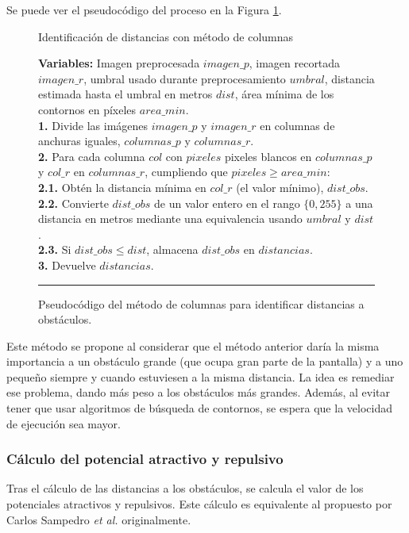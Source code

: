 \begin{itemize}
Se puede ver el pseudocódigo del proceso en la Figura \ref{alg:column}.

\begin{figure}[h]
\begin{algorithm}[H]
\caption{Identificación de distancias con método de columnas}
\textbf{Variables:} Imagen preprocesada $imagen\_p$, imagen recortada $imagen\_r$, umbral usado durante preprocesamiento $umbral$, distancia estimada hasta el umbral en metros $dist$, área mínima de los contornos en píxeles $area\_min$.\\
\textbf{1.} Divide las imágenes $imagen\_p$ y $imagen\_r$ en columnas de anchuras iguales, $columnas\_p$ y $columnas\_r$.\\
\textbf{2.} Para cada columna $col$ con $pixeles$ pixeles blancos en $columnas\_p$ y $col\_r$ en $columnas\_r$, cumpliendo que $pixeles \geq area\_min$:\\
\Indp\textbf{2.1.} Obtén la distancia mínima en $col\_r$ (el valor mínimo), $dist\_obs$.\\
\textbf{2.2.} Convierte $dist\_obs$ de un valor entero en el rango $\{0, 255\}$ a una distancia en metros mediante una equivalencia usando $umbral$ y $dist$.\\
\textbf{2.3.} Si $dist\_obs \leq dist$, almacena $dist\_obs$ en $distancias$.\\
\Indm \textbf{3.} Devuelve $distancias$.
\end{algorithm}
\hrule
\caption{Pseudocódigo del método de columnas para identificar distancias a obstáculos.}
\label{alg:column}
\end{figure}

Este método se propone al considerar que el método anterior daría la misma importancia a un obstáculo grande (que ocupa gran parte de la pantalla) y a uno pequeño siempre y cuando estuviesen a la misma distancia. La idea es remediar ese problema, dando más peso a los obstáculos más grandes. Además, al evitar tener que usar algoritmos de búsqueda de contornos, se espera que la velocidad de ejecución sea mayor.

\end{itemize}

\subsubsection{Cálculo del potencial atractivo y repulsivo}

Tras el cálculo de las distancias a los obstáculos, se calcula el valor de los potenciales atractivos y repulsivos. Este cálculo es equivalente al propuesto por Carlos Sampedro \textit{et al.} \cite{Sampedro2018} originalmente.


